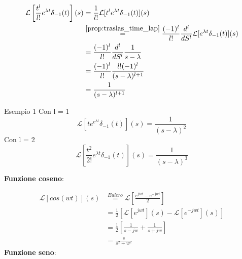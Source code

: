 \documentclass[a4paper]{article}
\theoremstyle{definition}
\theoremstyle{remark}
\begin{document}
\begin{align*}
    \mathcal{L}\left[\frac{t^l}{l!}e^{\lambda t}\delta_{-1}(t)\right](s) &= \frac{1}{l!}\mathcal{L}[t^l e^{\lambda t}\delta_{-1}(t)](s)\\
    &\stackrel{\ref{prop:traslas_time_lap}}{=} \frac{(-1)^l}{l!}\frac{d^l}{dS^l}\mathcal{L}[e^{\lambda t}\delta_{-1}(t)](s)\\
    &= \frac{(-1)^l}{l!}\frac{d^l}{dS^l}\frac{1}{s-\lambda}\\
    &= \frac{(-1)^l}{l!}\frac{l! (-1)^l}{(s-\lambda)^{l+1}}\\
    &= \frac{1}{(s-\lambda)^{l+1}}
\end{align*}
\begin{examplebox}{Esempio 1}
    Con l = 1 
    \[\mathcal{L}[te^{e^{\lambda t}}\delta_{-1}(t)](s) = \frac{1}{(s-\lambda)^2}\]
    Con l = 2
    \[\mathcal{L}\left[\frac{t^2}{2!}e^{\lambda t}\delta_{-1}(t)\right](s) = \frac{1}{(s-\lambda)^3}\]
\end{examplebox}
\noindent
\textbf{Funzione coseno}:
\begin{figure}[H]
    \centering
\end{figure}
\begin{align*}
\mathcal{L}[cos(wt)](s) &\stackrel{Eulero}{=} \mathcal{L}\left[\frac{e^{jwt} - e^{-jwt}}{2}\right]\\
&= \frac{1}{2}\left[\mathcal{L}[e^{jwt}](s) - \mathcal{L}[e^{-jwt}](s)\right] \\
&= \frac{1}{2}\left[\frac{1}{s-jw} + \frac{1}{s+jw}\right] \\
&= \frac{s}{s^2 + w^2}
\end{align*}
\textbf{Funzione seno}:
\begin{figure}[H]
    \centering
\end{figure}
\end{document}
